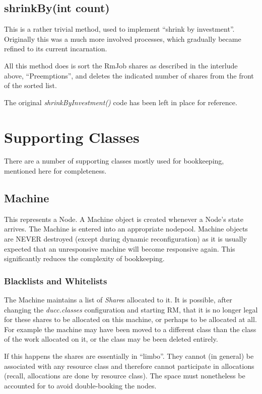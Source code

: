 \subsection{shrinkBy(int count)}
    This is a rather trivial method, used to implement ``shrink by investment''.  Originally
    this was a much more involved processes, which gradually became refined to its current
    incarnation.

    All this method does is sort the RmJob shares as described in the interlude above, ``Preemptions'',
    and deletes the indicated number of shares from the front of the sorted list.

    The original {\em shrinkByInvestment()} code has been left in place for reference.

\section{Supporting Classes}
   There are a number of supporting classes mostly used for bookkeeping, mentioned here for completeness.

\subsection{Machine}
This represents a Node.  A Machine object is created whenever a Node's state arrives.  The Machine
is entered into an appropriate nodepool.  Machine objects are NEVER destroyed (except during dynamic
reconfiguration) as it is usually expected that an unresponsive machine will become responsive
again.  This significantly reduces the complexity of bookkeeping.

\subsubsection{Blacklists and Whitelists}
The Machine maintains a list of {\em Share}s allocated to it.  It is possible, after changing the
{\em ducc.classes} configuration and starting RM, that it is no longer legal for these shares to be
allocated on this machine, or perhaps to be allocated at all.  For example the machine may have been
moved to a different class than the class of the work allocated on it, or the class may be been
deleted entirely.

   If this happens the shares are essentially in ``limbo''.  They cannot (in general) be associated
   with any resource class and therefore cannot participate in allocations (recall, allocations are
   done by resource class).  The space must nonetheless be accounted for to avoid double-booking the nodes.

